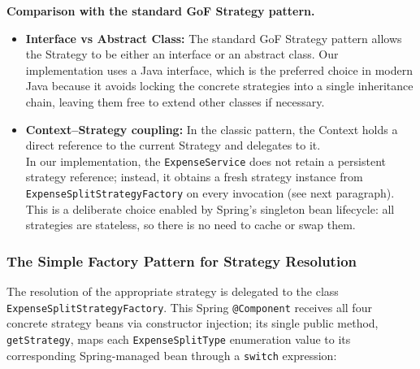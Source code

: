 \textbf{Comparison with the standard GoF Strategy pattern.}
\begin{itemize}
    \item \textbf{Interface vs Abstract Class:} The standard GoF Strategy pattern allows the Strategy to be either an interface or an abstract class. Our implementation uses a Java interface, which is the preferred choice in modern Java because it avoids locking the concrete strategies into a single inheritance chain, leaving them free to extend other classes if necessary.
    \item \textbf{Context--Strategy coupling:} In the classic pattern, the Context holds a direct reference to the current Strategy and delegates to it.\\In our implementation, the \texttt{ExpenseService} does not retain a persistent strategy reference; instead, it obtains a fresh strategy instance from\\\texttt{ExpenseSplitStrategyFactory} on every invocation (see next paragraph). This is a deliberate choice enabled by Spring's singleton bean lifecycle: all strategies are stateless, so there is no need to cache or swap them.
\end{itemize}

\subsubsection{The Simple Factory Pattern for Strategy Resolution}
\label{sec:factory-pattern}
The resolution of the appropriate strategy is delegated to the class\\\texttt{ExpenseSplitStrategyFactory}. This Spring \texttt{@Component} receives all four concrete strategy beans via constructor injection; its single public method,\\\texttt{getStrategy}, maps each \texttt{ExpenseSplitType} enumeration value to its corresponding Spring-managed bean through a \texttt{switch} expression:

